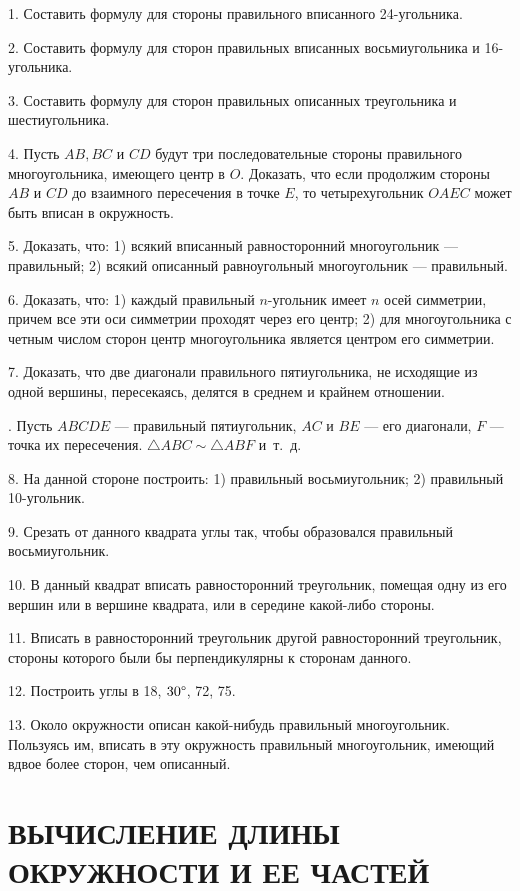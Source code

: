 \documentclass[oneside]{book}
\begin{document}
1.
Составить формулу для стороны правильного вписанного 24-угольника.

2.
Составить формулу для сторон правильных вписанных восьмиугольника и 16-угольника.

3.
Составить формулу для сторон правильных описанных треугольника и шестиугольника.

4.
Пусть $AB, BC$ и $CD$ будут три последовательные стороны правильного многоугольника, имеющего центр в $O$.
Доказать, что если продолжим стороны $AB$ и $CD$ до взаимного пересечения в точке $E$, то четырехугольник $OAEC$ может быть вписан в окружность.

5.
Доказать, что:
1) всякий вписанный равносторонний многоугольник — правильный;
2) всякий описанный равноугольный многоугольник — правильный.

6.
Доказать, что:
1) каждый правильный $n$-угольник имеет $n$ осей симметрии, причем все эти оси симметрии проходят через его центр;
2) для многоугольника с четным числом сторон центр многоугольника является центром его симметрии.

7.
Доказать, что две диагонали правильного пятиугольника, не исходящие из одной вершины, пересекаясь, делятся в среднем и крайнем отношении.

.
Пусть $ABCDE$ — правильный пятиугольник, $AC$ и $BE$ — его диагонали, $F$ — точка их пересечения.
$\triangle ABC \sim \triangle ABF$ и~т.~д.

8.
На данной стороне построить:
1) правильный восьмиугольник;
2) правильный 10-угольник.

9.
Срезать от данного квадрата углы так, чтобы образовался правильный восьмиугольник.

10.
В данный квадрат вписать равносторонний треугольник, помещая одну из его вершин или в вершине квадрата, или в середине какой-либо стороны.

11.
Вписать в равносторонний треугольник другой равносторонний треугольник, стороны которого были бы перпендикулярны к сторонам данного.

12.
Построить углы в 18\degree , $30\degree$, 72\degree , 75\degree .

13.
Около окружности описан какой-нибудь правильный многоугольник.
Пользуясь им, вписать в эту окружность правильный многоугольник, имеющий вдвое более сторон, чем описанный.

\section{ВЫЧИСЛЕНИЕ ДЛИНЫ ОКРУЖНОСТИ И ЕЕ ЧАСТЕЙ}
\end{document}
